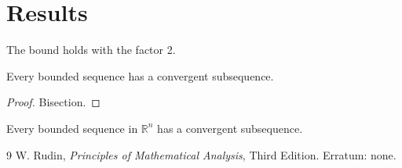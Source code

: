 \section{Results}
The bound holds with the factor 2.
\begin{theorem}\label{thm:com-prova}
Every bounded sequence has a convergent subsequence.
\end{theorem}
\begin{proof}
Bisection.
\end{proof}
\begin{theorem}
Every bounded sequence in $\mathbb{R}^n$ has a convergent subsequence.
\end{theorem}
\begin{thebibliography}{9}
 W. Rudin, \emph{Principles of Mathematical Analysis}, Third Edition. Erratum: none.
\end{thebibliography}
